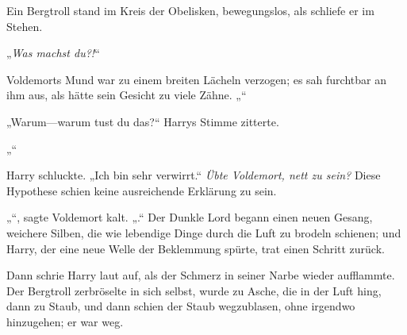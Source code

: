 Ein Bergtroll stand im Kreis der Obelisken, bewegungslos, als schliefe er im Stehen.

„\emph{Was machst du?!}“

Voldemorts Mund war zu einem breiten Lächeln verzogen; es sah furchtbar an ihm aus, als hätte sein Gesicht zu viele Zähne.
„“

„Warum—warum tust du das?“ Harrys Stimme zitterte.

„“

Harry schluckte. „Ich bin sehr verwirrt.“
\emph{Übte Voldemort, nett zu sein?} Diese Hypothese schien keine ausreichende Erklärung zu sein.

„“, sagte Voldemort kalt. „.“
Der Dunkle Lord begann einen neuen Gesang, weichere Silben, die wie lebendige Dinge durch die Luft zu brodeln schienen; und Harry, der eine neue Welle der Beklemmung spürte, trat einen Schritt zurück.

Dann schrie Harry laut auf, als der Schmerz in seiner Narbe wieder aufflammte. Der Bergtroll zerbröselte in sich selbst, wurde zu Asche, die in der Luft hing, dann zu Staub, und dann schien der Staub wegzublasen, ohne irgendwo hinzugehen; er war weg.

